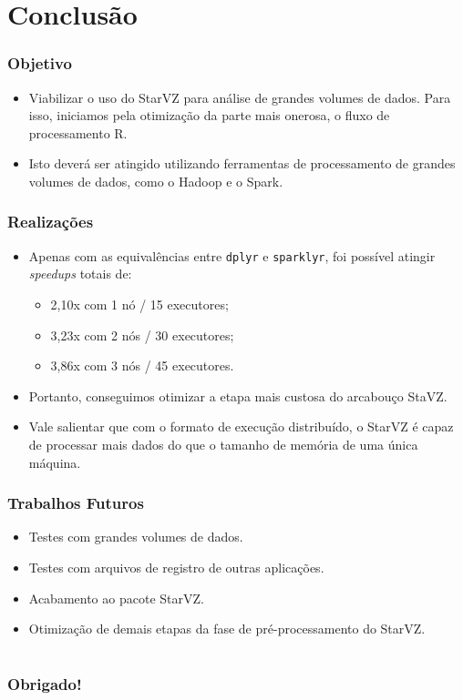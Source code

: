 \documentclass{beamer}
\begin{document}
\section{Conclusão}
\begin{frame}
 \frametitle{Objetivo}
 \begin{itemize}
 \item Viabilizar o uso do StarVZ para análise de grandes volumes de dados. 
Para isso, iniciamos pela otimização da parte mais onerosa, o fluxo 
de processamento R.
 \item Isto deverá ser atingido utilizando ferramentas de processamento de 
grandes volumes de dados, como o Hadoop e o Spark.
 \end{itemize}
\end{frame}

\begin{frame}
 \frametitle{Realizações}
 \begin{itemize}
  \item Apenas com as equivalências entre \texttt{dplyr} e \texttt{sparklyr}, 
foi possível atingir \emph{speedups} totais de:	
    \begin{itemize}
      \item 2,10x com 1 nó / 15 executores;
      \item 3,23x com 2 nós / 30 executores;
      \item 3,86x com 3 nós / 45 executores.
    \end{itemize}
  \item Portanto, conseguimos otimizar a etapa mais custosa do arcabouço StaVZ.
  \item Vale salientar que com o formato de execução distribuído, o StarVZ é 
capaz de processar mais dados do que o tamanho de memória de uma única máquina.
 \end{itemize}
\end{frame}

\begin{frame}
 \frametitle{Trabalhos Futuros}
 \begin{itemize}
  \item Testes com grandes volumes de dados.
  \item Testes com arquivos de registro de outras aplicações.
  \item Acabamento ao pacote StarVZ.
  \item Otimização de demais etapas da fase de pré-processamento do StarVZ.
 \end{itemize}
\end{frame}


\section*{}
\begin{frame}
    \frametitle{Obrigado!}
    \InfContacts
\end{frame}
\end{document}
